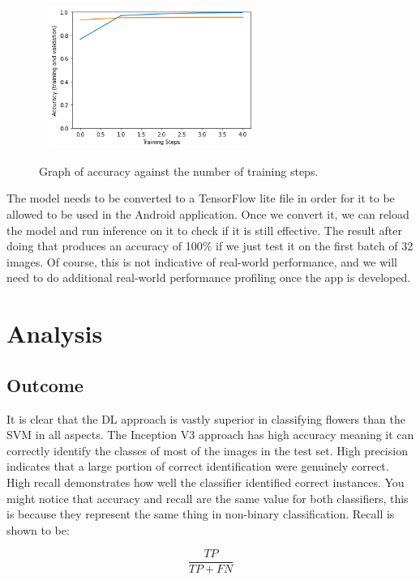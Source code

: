 \documentclass[12pt,a4paper]{report}
\begin{document}
\begin{figure}[h]\
    \centering
    \includegraphics[width=0.6\textwidth]{inception_acc.png}
    \caption{Graph of accuracy against the number of training steps.}
    \label{fig:incep_acc}
\end{figure}

The model needs to be converted to a TensorFlow lite file in order for it to be allowed to be used in the Android 
application. Once we convert it, we can reload the model and run inference on it to check if it is still effective. The 
result after doing that produces an accuracy of 100\% if we just test it on the first batch of 32 images. Of course, 
this is not indicative of real-world performance, and we will need to do additional real-world performance profiling 
once the app is developed. 

\section{Analysis}

\subsection{Outcome}

It is clear that the DL approach is vastly superior in classifying flowers than the SVM in all aspects. The Inception V3
approach has high accuracy meaning it can correctly identify the classes of most of the images in the test set. 
High precision indicates that a large portion of correct identification were genuinely correct. High recall demonstrates
how well the classifier identified correct instances. You might notice that accuracy and recall are the same value for 
both classifiers, this is because they represent the same thing in non-binary classification. Recall is shown to be:

\begin{equation}
    \frac{TP}{TP+FN}
\end{equation}
\end{document}
